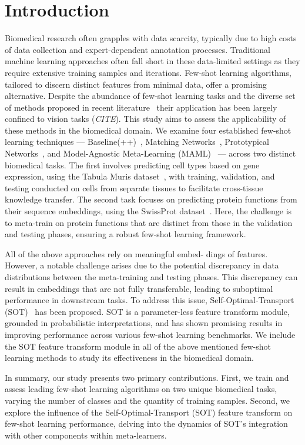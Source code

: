 \section{Introduction}

Biomedical research often grapples with data scarcity, typically due to high costs of data collection and expert-dependent annotation processes. Traditional machine learning approaches often fall short in these data-limited settings as they require extensive training samples and iterations. Few-shot learning algorithms, tailored to discern distinct features from minimal data, offer a promising alternative. Despite the abundance of few-shot learning tasks and the diverse set of methods proposed in recent literature~\cite{baseline, matchingnet, protonet, maml} their application has been largely confined to vision tasks (\textit{CITE}). This study aims to assess the applicability of these methods in the biomedical domain. We examine four established few-shot learning techniques — Baseline(++)~\cite{baseline}, Matching Networks~\cite{matchingnet}, Prototypical Networks~\cite{protonet}, and Model-Agnostic Meta-Learning (MAML)~\cite{maml} — across two distinct biomedical tasks. The first involves predicting cell types based on gene expression, using the Tabula Muris dataset~\cite{tabula2018}, with training, validation, and testing conducted on cells from separate tissues to facilitate cross-tissue knowledge transfer. The second task focuses on predicting protein functions from their sequence embeddings, using the SwissProt dataset~\cite{uniprot2019}. Here, the challenge is to meta-train on protein functions that are distinct from those in the validation and testing phases, ensuring a robust few-shot learning framework.

All of the above approaches rely on meaningful embed-
dings of features. However, a notable challenge arises due to the potential discrepancy in data distributions between the meta-training and testing phases. This discrepancy can result in embeddings that are not fully transferable, leading to suboptimal performance in downstream tasks. To address this issue, Self-Optimal-Transport (SOT)~\cite{sot} has been proposed. SOT is a parameter-less feature transform module, grounded in probabilistic interpretations, and has shown promising results in improving performance across various few-shot learning benchmarks. We include the SOT feature transform module in all of the above mentioned few-shot learning methods to study its effectiveness in the biomedical domain.

In summary, our study presents two primary contributions. First, we train and assess leading few-shot learning algorithms on two unique biomedical tasks, varying the number of classes and the quantity of training samples. Second, we explore the influence of the Self-Optimal-Transport (SOT) feature transform on few-shot learning performance, delving into the dynamics of SOT's integration with other components within meta-learners.